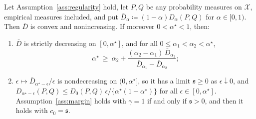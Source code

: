 \begin{lemma}
\label{lem:pathconvex}
Let Assumption~\ref{ass:regularity} hold, let $P,Q$ be any probability measures on $\mathcal X$, empirical measures
included, and put $\bar D_{\alpha}\coloneqq(1-\alpha)D_\alpha(P,Q)$ for $\alpha\in[0,1)$. Then $\bar D$ is convex and
nonincreasing. If moreover $0<\alpha^\star<1$, then:
\begin{enumerate}[label=(\roman*),leftmargin=*]
\item $\bar D$ is strictly decreasing on $[0,\alpha^\star]$, and for all $0\le\alpha_1<\alpha_2<\alpha^\star$,
\[
\alpha^\star\ \ge\ \alpha_2+\frac{(\alpha_2-\alpha_1)\,\bar D_{\alpha_2}}{\bar D_{\alpha_1}-\bar D_{\alpha_2}} ;
\]
\item $\epsilon\mapsto \bar D_{\alpha^\star-\epsilon}/\epsilon$ is nondecreasing on $(0,\alpha^\star]$, so it has a limit
$\mathfrak s\ge0$ as $\epsilon\downarrow0$, and $D_{\alpha^\star-\epsilon}(P,Q)\le D_0(P,Q)\,\epsilon/\{\alpha^\star(1-\alpha^\star)\}$
for all $\epsilon\in[0,\alpha^\star]$. Assumption~\ref{ass:margin} holds with $\gamma=1$ if and only if $\mathfrak s>0$, and then
it holds with $c_0=\mathfrak s$.
\end{enumerate}
\end{lemma}

